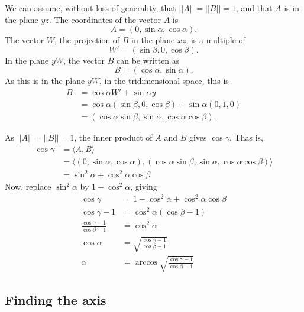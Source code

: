 \documentclass{article}
\begin{document}
We can assume, without loss of generality,
that $||A|| = ||B|| = 1$,
and that $A$ is in the plane $yz$.
The coordinates of the vector $A$ is
\begin{equation*}
    A = (0, \sin \alpha, \cos \alpha).
\end{equation*}
The vector $W$, the projection of $B$ in the plane $xz$,
is a multiple of
\begin{equation*}
    W' = (\sin \beta, 0, \cos \beta).
\end{equation*}
In the plane $yW$, the vector $B$ can be written as
\begin{equation*}
    B = (\cos \alpha, \sin \alpha).
\end{equation*}
As this is in the plane $yW$, in the tridimensional space,
this is
\begin{align*}
    B &= \cos \alpha W' + \sin \alpha y \\
      &= \cos \alpha (\sin \beta, 0, \cos \beta) + \sin \alpha (0, 1, 0) \\
      &= (\cos \alpha \sin \beta, \sin \alpha, \cos \alpha \cos \beta).
\end{align*}

As $||A|| = ||B|| = 1$, the inner product of $A$ and $B$ gives $\cos \gamma$.
Thas is,
\begin{align*}
    \cos \gamma &= \langle A, B \rangle \\
                &= \langle (0, \sin \alpha, \cos \alpha),
            (\cos \alpha \sin \beta, \sin \alpha, \cos \alpha \cos \beta) \rangle \\
                &= \sin^2 \alpha + \cos^2 \alpha \cos \beta
\end{align*}
Now, replace $\sin^2 \alpha$ by $1 - \cos^2 \alpha$, giving
\begin{align*}
    \cos \gamma &= 1 - \cos^2 \alpha + \cos^2 \alpha \cos \beta \\
    \cos \gamma - 1 &= \cos^2 \alpha( \cos \beta - 1 ) \\
    \frac{\cos \gamma - 1}{\cos \beta - 1} &= \cos^2 \alpha \\
    \cos \alpha &= \sqrt{\frac{\cos \gamma - 1}{\cos \beta - 1}} \\
    \alpha &= \arccos \sqrt{\frac{\cos \gamma - 1}{\cos \beta - 1}}
\end{align*}

\subsection{Finding the axis}
\label{sec:finding-the-axis}
\end{document}
